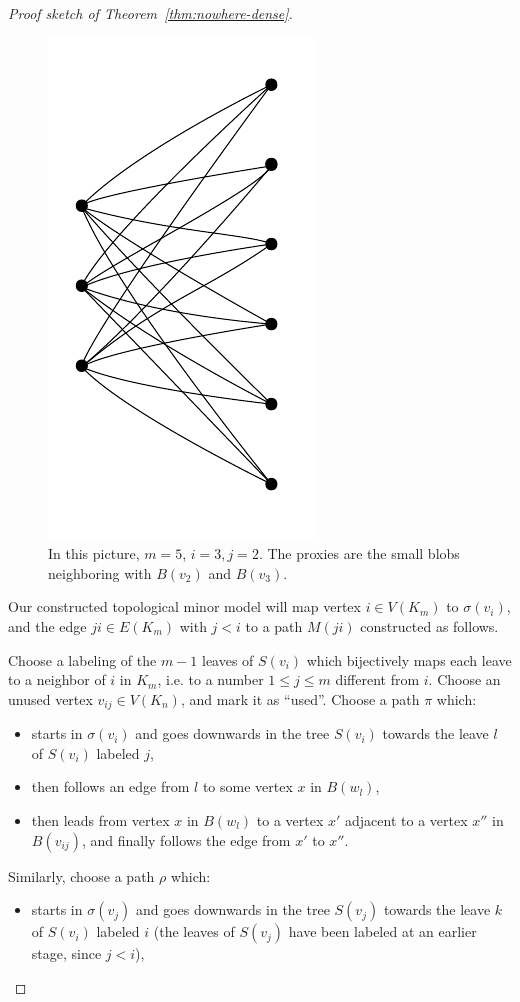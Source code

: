 \begin{proof}[Proof sketch of Theorem~\ref{thm:nowhere-dense}]
	\begin{figure}[h]
	  \centering
	    \includegraphics[scale=0.32,page=12]{pictures.pdf}
	  \caption{In this picture, $m=5$, $i=3,j=2$. The proxies are the small blobs neighboring with $B(v_2)$ and $B(v_3)$.
	  } 
	  \label{fig:proxies}
	\end{figure}	

Our constructed topological minor model will map vertex $i\in V(K_m)$ to $\sigma(v_i)$, and the edge $ji\in E(K_m)$ with $j<i$
to a path $M(ji)$ constructed as follows.

 Choose a labeling of the $m-1$ leaves of $S(v_i)$ which bijectively maps
each leave to a neighbor of $i$ in $K_m$, i.e. to a number $1\le j\le m$ different from $i$.
Choose an unused vertex $v_{ij}\in V(K_n)$, and mark it as ``used''.
Choose a path $\pi$
which:
\begin{itemize}
  \item  starts in $\sigma(v_i)$ and goes downwards in the tree $S(v_i)$ towards the leave $l$ of $S(v_i)$
  labeled $j$,
  
  \item then follows an edge from $l$ to some vertex $x$ in $B(w_l)$,
  
  \item then leads from vertex $x$ in $B(w_l)$ to a vertex 
  $x'$ adjacent to a vertex $x''$ in $B(v_{ij})$,
  and finally follows the edge from $x'$ to $x''$.
\end{itemize}
Similarly, choose a path $\rho$ which:
\begin{itemize}
  \item  starts in $\sigma(v_j)$ and goes downwards in the tree $S(v_j)$ towards the leave $k$ of $S(v_i)$
labeled $i$ (the leaves of $S(v_j)$ have been labeled 
at an earlier stage, since $j<i$),
  

\end{itemize}
\end{proof}
